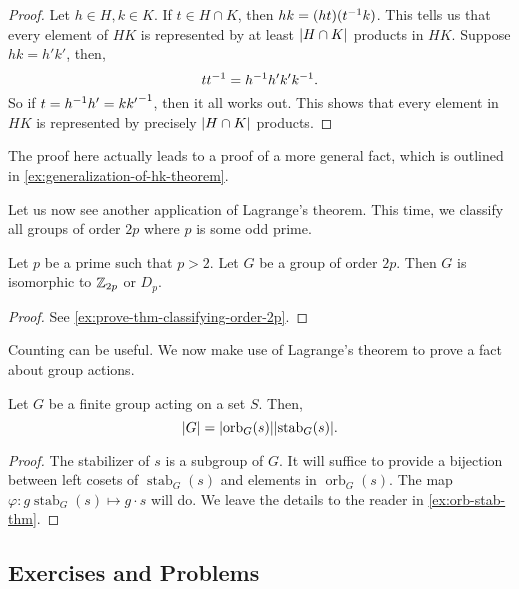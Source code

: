 \documentclass[./main.tex]{subfiles}
\begin{document}
\begin{proof}
    Let $h \in H, k\in K$. If $t \in H \cap K$, then $hk = (ht)(t^{-1} k)$. This
    tells us that every element of $HK$ is represented by at least $\abs{H \cap
    K}$ products in $HK$. Suppose $hk = h' k'$, then,
    \[
        t t^{-1} = h^{-1} h' k' k^{-1}.
    \]
    So if $t = h^{-1} h' = k {k'}^{-1}$, then it all works out. This shows that
    every element in $HK$ is represented by precisely $\abs{H \cap K}$ products.
\end{proof}
The proof here actually leads to a proof of a more general fact, which is outlined in \cref{ex:generalization-of-hk-theorem}.


Let us now see another application of Lagrange's theorem. This time, we classify
all groups of order $2p$ where $p$ is some odd prime.
\begin{theorem}
\label{thm:groups-order-2p}
    Let $p$ be a prime such that $p > 2$. Let $G$ be a group of order $2p$. Then
    $G$ is isomorphic to $\mathbb{Z}_{2p}$ or $D_p$.
\end{theorem}
\begin{proof}
    See \cref{ex:prove-thm-classifying-order-2p}.
\end{proof}


Counting can be useful. We now make use of Lagrange's theorem to prove a fact
about group actions.
\begin{theorem}
\label{thm:orb-stab-thm}
    Let $G$ be a finite group acting on a set $S$. Then,
    \[
        \abs{G} = \abs{\operatorname{orb}_G (s)} \abs{\operatorname{stab}_G (s)}.
    \]
\end{theorem}
\begin{proof}
    The stabilizer of $s$ is a subgroup of $G$. It will suffice to provide a
    bijection between left cosets of $\operatorname{stab}_G (s)$ and elements in
    $\operatorname{orb}_G(s)$. The map $\varphi: g \operatorname{stab}_G (s) \mapsto g
    \cdot s$ will do. We leave the details to the reader in
    \cref{ex:orb-stab-thm}.
\end{proof}


\subsection{Exercises and Problems}
\end{document}
